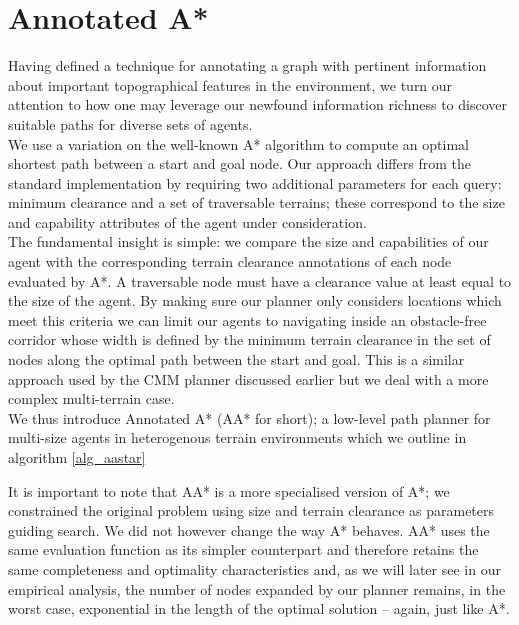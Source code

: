 \section{Annotated A*}
\label{aha:aastar}
Having defined a technique for annotating a graph with pertinent information about important topographical features in the environment, we turn our attention to how one may leverage our newfound information richness to discover suitable paths for diverse sets of agents. \\ \newline
We use a variation on the well-known A* algorithm \cite{astar} to compute an optimal shortest path between a start and goal node.  Our approach differs from the standard implementation by requiring two additional parameters for each query: minimum clearance and a set of traversable terrains; these correspond to the size and capability attributes of the agent under consideration. \\ \newline
The fundamental insight is simple: we compare the size and capabilities of our agent with the corresponding terrain clearance annotations of each node evaluated by A*. A traversable node must have a clearance value at least equal to the size of the agent. By making sure our planner only considers locations which meet this criteria we can limit our agents to navigating inside an obstacle-free corridor whose width is defined by the minimum terrain clearance in the set of nodes along the optimal path between the start and goal. This is a similar approach used by the  CMM planner \cite{geraerts07} discussed earlier but we deal with a more complex multi-terrain case. \\ \newline
We thus introduce Annotated A* (AA* for short); a low-level path planner for multi-size agents in heterogenous terrain environments which we outline in algorithm \ref{alg_aastar}

It is important to note that AA* is a more specialised version of A*; we constrained the original problem using size and terrain clearance as parameters guiding search. We did not however change the way A* behaves. AA* uses the same evaluation function as its simpler counterpart and therefore retains the same completeness and optimality characteristics and, as we will later see in our empirical analysis, the number of nodes expanded by our planner remains, in the worst case, exponential in the length of the optimal solution -- again, just like A*.
